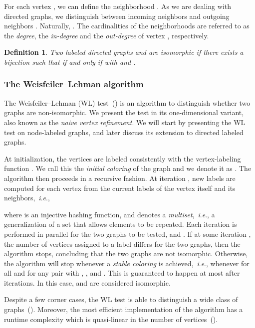 \documentclass{article} \usepackage{iclr2019_conference,times}
\newtheorem{definition}{Definition}[section]
\newcommand{\ie}{\textit{i}.\textit{e}., }
\begin{document}
For each vertex , we can define the neighborhood . As we are dealing with directed graphs, we distinguish between incoming neighbors  and outgoing neighbors . Naturally, . The cardinalities  of the neighborhoods are referred to as the \emph{degree}, the \emph{in-degree} and the \emph{out-degree} of vertex , respectively.

\begin{definition}
Two labeled directed graphs  and  are \emph{isomorphic} if there exists a bijection  such that  if and only if  with  and . 
\end{definition} 

\subsubsection{The Weisfeiler--Lehman algorithm}\label{sec:wl_test}

The Weisfeiler--Lehman (WL) test~(\cite{Weisfeiler1968}) is an algorithm to distinguish whether two graphs are non-isomorphic. We present the test in its one-dimensional variant, also known as the \emph{naive vertex refinement}. We will start by presenting the WL test on node-labeled graphs, and later discuss its extension to directed labeled graphs. 

At initialization, the vertices are labeled consistently with the vertex-labeling function . We call this the \emph{initial coloring} of the graph and we denote it as . The algorithm then proceeds in a recursive fashion. At iteration , new labels are computed for each vertex from the current labels of the vertex itself and its neighbors,~\ie

where  is an injective hashing function, and  denotes a \emph{multiset},~\ie a generalization of a set that allows elements to be repeated.
Each iteration is performed in parallel for the two graphs to be tested,  and . If at some iteration , the number of vertices assigned to a label  differs for the two graphs, then the algorithm stops, concluding that the two graphs are not isomorphic. Otherwise, the algorithm will stop whenever a \emph{stable coloring} is achieved,~\ie whenever  for all  and for any pair  with , , and .
This is guaranteed to happen at most after  iterations.
In this case,  and  are considered isomorphic. 

Despite a few corner cases, the WL test is able to distinguish a wide class of graphs~(\cite{Cai1992}). Moreover, the most efficient implementation of the algorithm has a runtime complexity which is quasi-linear in the number of vertices~(\cite{Grohe2017a}).
\end{document}
